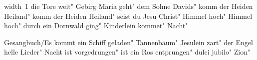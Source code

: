 \ifx\mxversion\undefined
  
  
  
  
\fi

%
\hbox{\pdfximage width 1\pdfrefximage\pdflastximage}\vfill\eject
\tableofcontents
\normalmusicsize
 die Tore weit"
 Gebirg Maria geht"
 dem Sohne Davids"
 komm der Heiden Heiland"
 komm der Heiden Heiland"
 seist du Jesu Christ"
 Himmel hoch"
 Himmel hoch"
 durch ein Dornwald ging"
 Kinderlein kommet"
 Nacht"

 Gesangbuch/Es kommt ein Schiff geladen"
 Tannenbaum"
\makeatletter
{}
\makeatother
 Jesulein zart"
\makeatletter
{}
\makeatother
 der Engel helle Lieder"
 Nacht ist vorgedrungen"
 ist ein Ros entprungen"
\makeatletter
{}
\makeatother
 dulci jubilo"
\makeatletter
{}
\makeatother
 Zion"
\bookbye